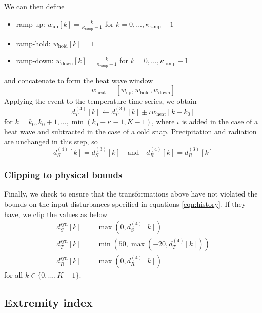 \documentclass[pdflatex,sn-mathphys-num]{sn-jnl}
\newcommand{\df}[2]{\displaystyle\frac{#1}{#2}}
\begin{document}
We can then define
\begin{itemize}
\item ramp-up:   $w_{\text{up}}[k]   = \df{k}{\kappa_{\text{ramp}} - 1}$ for $k=0,...,\kappa_{\text{ramp}} - 1$
\item ramp-hold: $w_{\text{hold}}[k] = 1$
\item ramp-down: $w_{\text{down}}[k] = \df{k}{\kappa_{\text{ramp}} - 1}$ for $k=0,...,\kappa_{\text{ramp}} - 1$
\end{itemize}
and concatenate to form the heat wave window
\begin{equation}
w_{\text{heat}} = [w_{\text{up}}, w_{\text{hold}}, w_{\text{down}}]
\label{eqn:w-heat}
\end{equation}
Applying the event to the temperature time series, we obtain
\begin{equation}
d_{T}^{(4)}[k] \leftarrow d_{T}^{(3)}[k] \pm \iota w_{\text{heat}}[k - k_{0}]
\label{eqn:T4a}
\end{equation}
for $k=k_{0}, k_{0}+1,...,\min(k_{0}+ \kappa - 1, K-1)$, where $\iota$ is added in the case of a heat wave and subtracted in the case of a cold snap. Precipitation and radiation are unchanged in this step, so
\begin{equation}
d_{S}^{(4)}[k] = d_{S}^{(3)}[k] \quad \text{and} \quad d_{R}^{(4)}[k] = d_{R}^{(3)}[k]
\label{eqn:P4P3-R4R3}
\end{equation}

\subsubsection{Clipping to physical bounds}\label{subsubsec:clipping}

Finally, we check to ensure that the transformations above have not violated the bounds on the input disturbances specified in equations \ref{eqn:history}. If they have, we clip the values as below
\begin{align}
d_{S}^{\text{syn}}[k] &= \max(0, d_{S}^{(4)}[k]) \\
d_{T}^{\text{syn}}[k] &= \min(50, \max(-20, d_{T}^{(4)}[k])) \\
d_{R}^{\text{syn}}[k] &= \max(0, d_{R}^{(4)}[k])
\label{eqn:PTR-syn}
\end{align}
for all $k\in\{ 0,...,K-1 \}$.

\subsection{Extremity index}\label{subsec:extremity}
\end{document}
